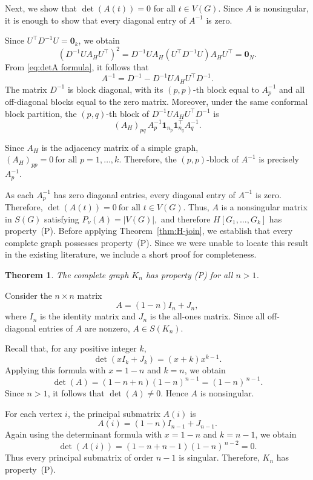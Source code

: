\documentclass[12pt,reqno]{amsart}
\newtheorem{thm}{Theorem}[section]
\theoremstyle{definition}
\numberwithin{equation}{subsection}
\newenvironment{pf}{\proof}{\endproof}
\numberwithin{equation}{section}
\def\det{\operatorname{det}}
\begin{document}
\begin{pf}
Next, we show that $\det(A(t))=0$ for all $t \in V(G)$. 
Since $A$ is nonsingular, it is enough to show that every diagonal entry of
$A^{-1}$ is zero.

Since $U^\top D^{-1}U = \mathbf{0}_k$, we obtain
\[
(D^{-1} U A_H U^\top)^2 =
D^{-1}UA_H(U^\top D^{-1}U)A_HU^\top = \mathbf{0}_N.
\]
From \eqref{eq:detA formula}, it follows that
\[
A^{-1} = D^{-1} - D^{-1} U A_H U^\top D^{-1}.
\]
 The matrix $D^{-1}$ is block diagonal, with its $(p,p)$-th block equal to $A_p^{-1}$ and all off-diagonal blocks equal to the zero matrix.
 Moreover, under the same conformal block partition, the $(p,q)$-th block of
$D^{-1}UA_HU^\top D^{-1}$ is
\[
(A_H)_{pq}\,A_p^{-1}\mathbf{1}_{n_p}\mathbf{1}_{n_q}^\top A_q^{-1}.
\]

Since \(A_H\) is the adjacency matrix of a simple graph,
\(
(A_H)_{pp}=0
\ \text{for all } p=1,\dots,k.
\)
Therefore, the $(p,p)$-block of $A^{-1}$ is precisely
$A_p^{-1}$.

As each \(A_p^{-1}\) has zero diagonal entries, every diagonal entry of
\(A^{-1}\) is zero. Therefore,
\(
\det(A(t))=0
\ \text{for all } t\in V(G).
\)
Thus, $A$ is a nonsingular matrix in $S(G)$ satisfying
\(
P_\nu(A)=|V(G)|,
\)
and therefore
\(
H[G_1,\dots,G_k]
\)
has property~(P).
\end{pf}
Before applying Theorem~\ref{thm:H-join}, we establish that every complete graph possesses property~(P). Since we were unable to locate this result in the existing literature, we include a short proof for completeness.

\begin{thm}\label{thm:Kn_PropertyP}
The complete graph $K_n$ has property (P) for all $n > 1$.
\end{thm}
\begin{pf}
Consider the $n \times n$ matrix $$A = (1-n)I_n + J_n,$$ where $I_n$ is the identity matrix and $J_n$ is the all-ones matrix. Since all off-diagonal entries of $A$ are nonzero, $A \in S(K_n)$.

Recall that, for any positive integer $k$,
\[
\det(xI_k+J_k)=(x+k)x^{k-1}.
\]
Applying this formula with \(x=1-n\) and \(k=n\), we obtain
\[
\det(A)
=(1-n+n)(1-n)^{n-1}
=(1-n)^{\,n-1}.
\]
Since \(n>1\), it follows that \(\det(A)\neq0\). Hence \(A\) is nonsingular.

For each vertex $i$, the principal submatrix $A(i)$ is
\[
A(i)=(1-n)I_{n-1}+J_{n-1}.
\]
Again using the determinant formula with $x=1-n$ and $k=n-1$, we obtain
\[
\det(A(i))
=(1-n+n-1)(1-n)^{\,n-2}
=0.
\]
Thus every principal submatrix of order $n-1$ is singular. Therefore, $K_n$ has property~(P).
\end{pf}
\end{document}
